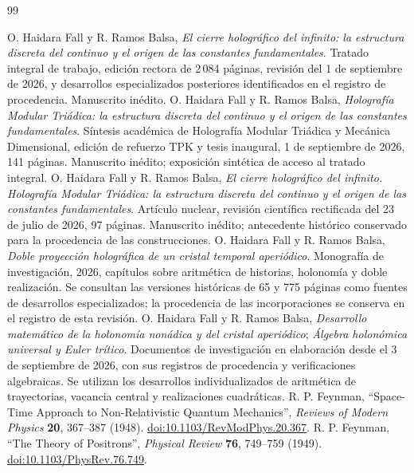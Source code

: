 \begin{thebibliography}{99}
{}
 O. Haidara Fall y R. Ramos Balsa, \emph{El cierre holográfico del infinito: la estructura discreta del continuo y el origen de las constantes fundamentales}. Tratado integral de trabajo, edición rectora de 2\,084 páginas, revisión del 1 de septiembre de 2026, y desarrollos especializados posteriores identificados en el registro de procedencia. Manuscrito inédito.
 O. Haidara Fall y R. Ramos Balsa, \emph{Holografía Modular Triádica: la estructura discreta del continuo y el origen de las constantes fundamentales}. Síntesis académica de Holografía Modular Triádica y Mecánica Dimensional, edición de refuerzo TPK y tesis inaugural, 1 de septiembre de 2026, 141 páginas. Manuscrito inédito; exposición sintética de acceso al tratado integral.
 O. Haidara Fall y R. Ramos Balsa, \emph{El cierre holográfico del infinito. Holografía Modular Triádica: la estructura discreta del continuo y el origen de las constantes fundamentales}. Artículo nuclear, revisión científica rectificada del 23 de julio de 2026, 97 páginas. Manuscrito inédito; antecedente histórico conservado para la procedencia de las construcciones.
 O. Haidara Fall y R. Ramos Balsa, \emph{Doble proyección holográfica de un cristal temporal aperiódico}. Monografía de investigación, 2026, capítulos sobre aritmética de historias, holonomía y doble realización. Se consultan las versiones históricas de 65 y 775 páginas como fuentes de desarrollos especializados; la procedencia de las incorporaciones se conserva en el registro de esta revisión.
 O. Haidara Fall y R. Ramos Balsa, \emph{Desarrollo matemático de la holonomía nonádica y del cristal aperiódico}; \emph{Álgebra holonómica universal y Euler trítico}. Documentos de investigación en elaboración desde el 3 de septiembre de 2026, con sus registros de procedencia y verificaciones algebraicas. Se utilizan los desarrollos individualizados de aritmética de trayectorias, vacancia central y realizaciones cuadráticas.
 R. P. Feynman, ``Space-Time Approach to Non-Relativistic Quantum Mechanics'', \emph{Reviews of Modern Physics} \textbf{20}, 367--387 (1948). \href{https://doi.org/10.1103/RevModPhys.20.367}{doi:10.1103/RevModPhys.20.367}.
 R. P. Feynman, ``The Theory of Positrons'', \emph{Physical Review} \textbf{76}, 749--759 (1949). \href{https://doi.org/10.1103/PhysRev.76.749}{doi:10.1103/PhysRev.76.749}.

\end{thebibliography}
